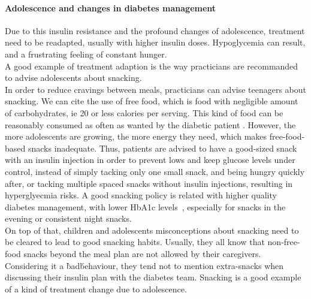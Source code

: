 \paragraph{Adolescence and changes in diabetes management}
Due to this insulin resistance and the profound changes of adolescence, treatment need to be readapted, usually with higher insulin doses. Hypoglycemia can result, and a frustrating feeling of constant hunger. \\A good example of treatment adaption is the way practicians are recommanded to advise adolescents about snacking. \\
In order to reduce cravings between meals, practicians can advise teenagers about snacking. We can cite the use of free food, which is food with negligible amount of carbohydrates, ie 20 or less calories per serving. This kind of food can be reasonably consumed as often as wanted by the diabetic patient \cite{tu1993assessment}. However, the more adolescents are growing, the more energy they need, which makes free-food-based snacks inadequate. Thus, patients are advised to have a good-sized snack with an insulin injection in order to prevent lows and keep glucose levels under control, instead of simply tacking only one small snack, and being hungry quickly after, or tacking multiple spaced snacks without insulin injections, resulting in hyperglyecmia risks. A good snacking policy is related with higher quality diabetes management, with lower HbA1c levels~\cite{delahanty1993role}, especially for snacks in the evening or consistent night snacks.
\\
On top of that, children and adolescents misconceptions about snacking need to be cleared to lead to good snacking habits. Usually, they all know that non-free-food snacks beyond the meal plan are not allowed by their caregivers. Considering it a \`bad\' behaviour, they tend not to mention extra-snacks when discussing their insulin plan with the diabetes team. Snacking is a good example of a kind of treatment change due to adolescence.

